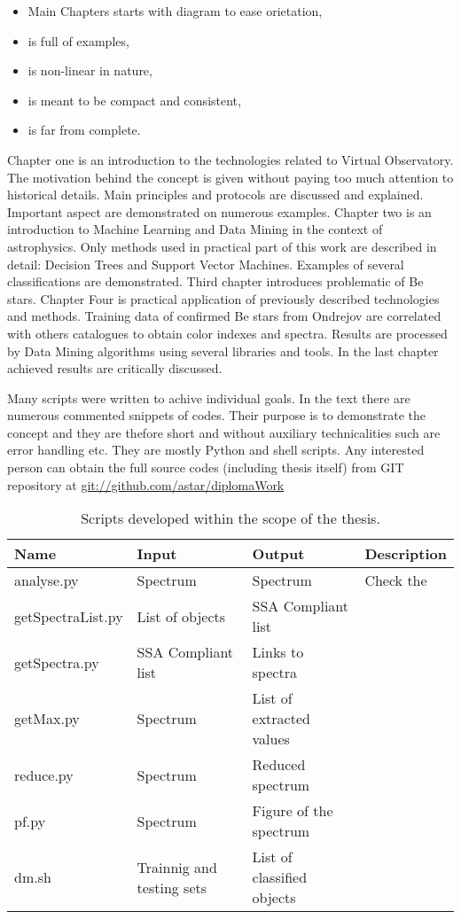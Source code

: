 \begin{itemize}
\item Main Chapters starts with diagram to ease orietation,
\item is full of examples, 
\item is non-linear in nature,
\item is meant to be compact and consistent,
\item is far from complete.
\end{itemize}

Chapter one is an introduction to the technologies related to Virtual
Observatory. The motivation behind the concept is given without paying
too much attention to historical details. Main principles and
protocols are discussed and explained. Important aspect are
demonstrated on numerous examples. Chapter two is an introduction to
Machine Learning and Data Mining in the context of astrophysics. Only
methods used in practical part of this work are described in detail:
Decision Trees and Support Vector Machines. Examples of several
classifications are demonstrated. Third chapter introduces problematic
of Be stars. Chapter Four is practical application of previously
described technologies and methods. Training data of confirmed Be
stars from Ondrejov are correlated with others catalogues to obtain
color indexes and spectra. Results are processed by Data Mining
algorithms using several libraries and tools. In the last chapter
achieved results are critically discussed. 

Many scripts were written to achive individual goals. In the text
there are numerous commented snippets of codes. Their purpose is to
demonstrate the concept and they are thefore short and without
auxiliary technicalities such are error handling etc. They are mostly
Python and shell scripts. Any interested person can obtain the full
source codes (including thesis itself) from GIT repository at
\url{git://github.com/astar/diplomaWork}


\begin{table}[ht]
  \centering
  \small
     \begin{tabular}[ht]{l l l l}
     \toprule
     Name & Input & Output & Description \\
     \midrule
     analyse.py & Spectrum & Spectrum & Check the \\
     getSpectraList.py & List of objects & SSA Compliant list & \\
     getSpectra.py & SSA Compliant list & Links to spectra & \\
     getMax.py & Spectrum & List of extracted values & \\
     reduce.py & Spectrum & Reduced spectrum & \\
     pf.py & Spectrum & Figure of the spectrum & \\
     dm.sh & Trainnig and testing sets & List of classified objects & \\ 
     \bottomrule
   \end{tabular}
  \caption{Scripts developed within the scope of the thesis.}
  \label{tab:scripts}
\end{table}






